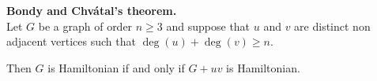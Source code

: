 \documentclass[12pt]{article}
\begin{document}
\textbf{Bondy and Chv\'atal's theorem.}\\
Let $G$ be a graph of order $n\ge 3$ and suppose that $u$ and $v$ are distinct non adjacent vertices such that $\deg(u)+\deg(v)\ge n$.

Then $G$ is Hamiltonian if and only if $G+uv$ is Hamiltonian.
\end{document}

